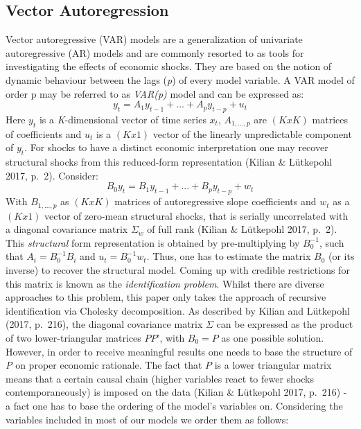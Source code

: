 \documentclass[12pt,]{article}
\begin{document}
\subsection{Vector Autoregression}\label{vector-autoregression}

Vector autoregressive (VAR) models are a generalization of univariate
autoregressive (AR) models and are commonly resorted to as tools for
investigating the effects of economic shocks. They are based on the
notion of dynamic behaviour between the lags (\emph{p}) of every model
variable. A VAR model of order p may be referred to as \emph{VAR(p)}
model and can be expressed as:
\[y_t = A_1 y_{t-1} + ... + A_p y_{t-p} + u_t\] Here \(y_t\) is a
\emph{K}-dimensional vector of time series \(x_t\), \(A_{1, ..., p}\)
are \((K x K)\) matrices of coefficients and \(u_t\) is a \((K x 1)\)
vector of the linearly unpredictable component of \(y_t\). For shocks to
have a distinct economic interpretation one may recover structural
shocks from this reduced-form representation (Kilian \& Lütkepohl 2017,
p.~2). Consider: \[B_0 y_t = B_1 y_{t-1} + ... + B_p y_{t-p} + w_t\]
With \(B_{1, ..., p}\) as \((K x K)\) matrices of autoregressive slope
coefficients and \(w_t\) as a \((K x 1)\) vector of zero-mean structural
shocks, that is serially uncorrelated with a diagonal covariance matrix
\(\Sigma_w\) of full rank (Kilian \& Lütkepohl 2017, p.~2). This
\emph{structural} form representation is obtained by pre-multiplying by
\(B_0^{-1}\), such that \(A_i = B_0^{-1} B_i\) and
\(u_t = B_0^{-1} w_t\). Thus, one has to estimate the matrix \(B_0\) (or
its inverse) to recover the structural model. Coming up with credible
restrictions for this matrix is known as the \emph{identification
problem}. Whilst there are diverse approaches to this problem, this
paper only takes the approach of recursive identification via Cholesky
decomposition. As described by Kilian and Lütkepohl (2017, p.~216), the
diagonal covariance matrix \(\Sigma\) can be expressed as the product of
two lower-triangular matrices \(PP’\), with \(B_0 = P\) as one possible
solution. However, in order to receive meaningful results one needs to
base the structure of \emph{P} on proper economic rationale. The fact
that \(P\) is a lower triangular matrix means that a certain causal
chain (higher variables react to fewer shocks contemporaneously) is
imposed on the data (Kilian \& Lütkepohl 2017, p.~216) - a fact one has
to base the ordering of the model's variables on. Considering the
variables included in most of our models we order them as follows:
\end{document}
